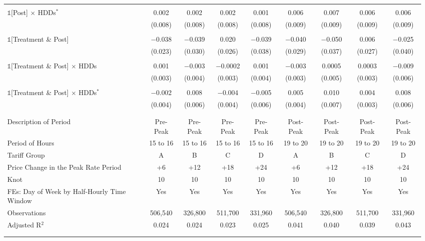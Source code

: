\begin{table}[t!]
\begin{ThreePartTable}
\begin{landscape}
\begin{longtable}{@{\extracolsep{1.5pt}}lcccccccc}
                & & & & & & & & \\
                $\mathbb{1}$[Post] $\times$ HDDs$^{*}$ & 0.002 & 0.002 & 0.002 & 0.001 & 0.006 & 0.007 & 0.006 & 0.006 \\
                & (0.008) & (0.008) & (0.008) & (0.008) & (0.009) & (0.009) & (0.009) & (0.009) \\
                & & & & & & & & \\
                $\mathbb{1}$[Treatment \& Post] & $-$0.038 & $-$0.039 & 0.020 & $-$0.039 & $-$0.040 & $-$0.050 & 0.006 & $-$0.025 \\
                & (0.023) & (0.030) & (0.026) & (0.038) & (0.029) & (0.037) & (0.027) & (0.040) \\
                & & & & & & & & \\
                $\mathbb{1}$[Treatment \& Post] $\times$ HDDs & 0.001 & $-$0.003 & $-$0.0002 & 0.001 & $-$0.003 & 0.0005 & 0.0003 & $-$0.009 \\
                & (0.003) & (0.004) & (0.003) & (0.004) & (0.003) & (0.005) & (0.003) & (0.006) \\
                & & & & & & & & \\
                $\mathbb{1}$[Treatment \& Post] $\times$ HDDs$^{*}$ & $-$0.002 & 0.008 & $-$0.004 & $-$0.005 & 0.005 & 0.010 & 0.004 & 0.008 \\
                & (0.004) & (0.006) & (0.004) & (0.006) & (0.004) & (0.007) & (0.003) & (0.006) \\
                & & & \\
                \hline
                \\[-2.0ex]
                Description of Period & Pre-Peak & Pre-Peak & Pre-Peak & Pre-Peak & Post-Peak & Post-Peak & Post-Peak & Post-Peak \\
                Period of Hours & 15 to 16 & 15 to 16 & 15 to 16 & 15 to 16 & 19 to 20 & 19 to 20 & 19 to 20 & 19 to 20 \\
                Tariff Group & A & B & C & D & A & B & C & D \\
                Price Change in the Peak Rate Period & +6 & +12 & +18 & +24 & +6 & +12 & +18 & +24 \\
                Knot & 10 & 10 & 10 & 10 & 10 & 10 & 10 & 10 \\
                FEs: Day of Week by Half-Hourly Time Window & Yes & Yes & Yes & Yes & Yes & Yes & Yes & Yes \\
                Observations & 506,540 & 326,800 & 511,700 & 331,960 & 506,540 & 326,800 & 511,700 & 331,960 \\
                Adjusted R$^{2}$ & 0.024 & 0.024 & 0.023 & 0.025 & 0.041 & 0.040 & 0.039 & 0.043 \\
                \\[-2.0ex]
                \hline \hline
                \\[-4.5ex]


\end{longtable}
\end{landscape}
\end{ThreePartTable}
\end{table}
